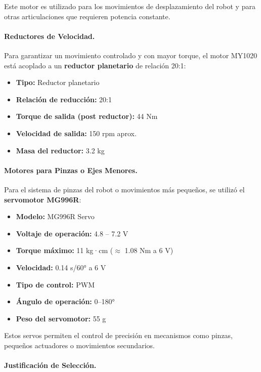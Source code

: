 Este motor es utilizado para los movimientos de desplazamiento del robot y para otras articulaciones que requieren potencia constante.

\paragraph{Reductores de Velocidad.}

Para garantizar un movimiento controlado y con mayor torque, el motor MY1020 está acoplado a un \textbf{reductor planetario} de relación 20:1:

\begin{itemize}
	\item \textbf{Tipo:} Reductor planetario
	\item \textbf{Relación de reducción:} 20:1
	\item \textbf{Torque de salida (post reductor):} 44 Nm
	\item \textbf{Velocidad de salida:} 150 rpm aprox.
	\item \textbf{Masa del reductor:} 3.2 kg
\end{itemize}

\paragraph{Motores para Pinzas o Ejes Menores.}

Para el sistema de pinzas del robot o movimientos más pequeños, se utilizó el \textbf{servomotor MG996R}:

\begin{itemize}
	\item \textbf{Modelo:} MG996R Servo
	\item \textbf{Voltaje de operación:} 4.8 – 7.2 V
	\item \textbf{Torque máximo:} 11 kg·cm ($\approx$ 1.08 Nm a 6 V)
	\item \textbf{Velocidad:} 0.14 s/60° a 6 V
	\item \textbf{Tipo de control:} PWM
	\item \textbf{Ángulo de operación:} 0–180°
	\item \textbf{Peso del servomotor:} 55 g
\end{itemize}

Estos servos permiten el control de precisión en mecanismos como pinzas, pequeños actuadores o movimientos secundarios.

\paragraph{Justificación de Selección.}

